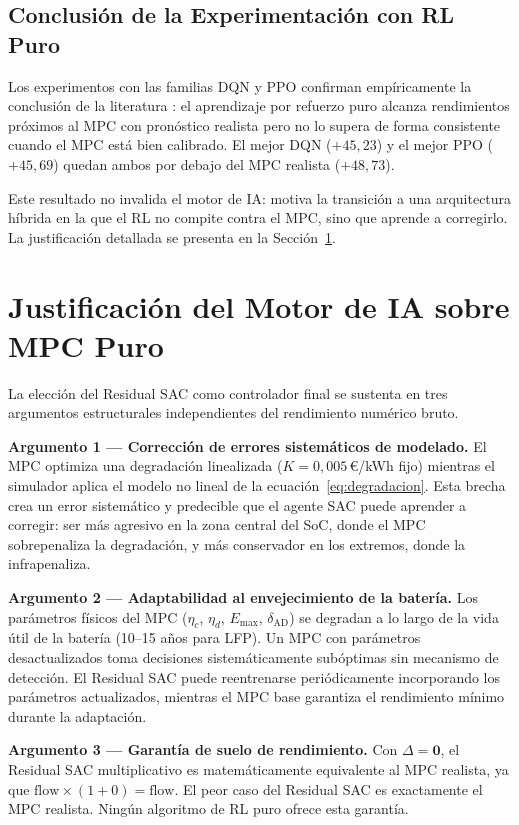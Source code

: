 \documentclass[12pt, a4paper, twoside]{report}
\begin{document}
\subsection{Conclusión de la Experimentación con RL Puro}

Los experimentos con las familias DQN y PPO confirman empíricamente la
conclusión de la literatura \citep{Zhan2023}: el aprendizaje por refuerzo puro
alcanza rendimientos próximos al MPC con pronóstico realista pero no lo supera
de forma consistente cuando el MPC está bien calibrado. El mejor DQN
($+45{,}23$) y el mejor PPO ($+45{,}69$) quedan ambos por debajo del MPC
realista ($+48{,}73$).

Este resultado no invalida el motor de IA: motiva la transición a una
arquitectura híbrida en la que el RL no compite contra el MPC, sino que aprende
a corregirlo. La justificación detallada se presenta en la
Sección~\ref{sec:justificacion}.

\section{Justificación del Motor de IA sobre MPC Puro}
\label{sec:justificacion}

La elección del Residual SAC como controlador final se sustenta en tres
argumentos estructurales independientes del rendimiento numérico bruto.

\textbf{Argumento 1 — Corrección de errores sistemáticos de modelado.} El MPC
optimiza una degradación linealizada ($K = 0{,}005$\,€/kWh fijo) mientras el
simulador aplica el modelo no lineal de la ecuación~\eqref{eq:degradacion}.
Esta brecha crea un error sistemático y predecible que el agente SAC puede
aprender a corregir: ser más agresivo en la zona central del SoC, donde el MPC
sobrepenaliza la degradación, y más conservador en los extremos, donde la
infrapenaliza.

\textbf{Argumento 2 — Adaptabilidad al envejecimiento de la batería.} Los
parámetros físicos del MPC ($\eta_c$, $\eta_d$, $E_{\max}$, $\delta_{\text{AD}}$)
se degradan a lo largo de la vida útil de la batería (10--15 años para LFP). Un
MPC con parámetros desactualizados toma decisiones sistemáticamente subóptimas
sin mecanismo de detección. El Residual SAC puede reentrenarse periódicamente
incorporando los parámetros actualizados, mientras el MPC base garantiza el
rendimiento mínimo durante la adaptación.

\textbf{Argumento 3 — Garantía de suelo de rendimiento.} Con $\Delta = \mathbf{0}$,
el Residual SAC multiplicativo es matemáticamente equivalente al MPC realista,
ya que $\text{flow} \times (1 + 0) = \text{flow}$. El peor caso del Residual SAC
es exactamente el MPC realista. Ningún algoritmo de RL puro ofrece esta
garantía.
\end{document}
